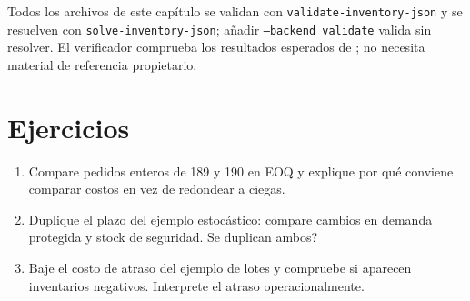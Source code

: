 Todos los archivos de este capítulo se validan con
\texttt{validate-inventory-json} y se resuelven con
\texttt{solve-inventory-json}; añadir \texttt{--backend validate} valida sin
resolver. El verificador  comprueba los
resultados esperados de ; no necesita
material de referencia propietario.

\section{Ejercicios}
\begin{enumerate}
\item Compare pedidos enteros de 189 y 190 en EOQ y explique por qué conviene
comparar costos en vez de redondear a ciegas.
\item Duplique el plazo del ejemplo estocástico: compare cambios en demanda
protegida y stock de seguridad. \textquestiondown{}Se duplican ambos?
\item Baje el costo de atraso del ejemplo de lotes y compruebe si aparecen
inventarios negativos. Interprete el atraso operacionalmente.
\end{enumerate}
